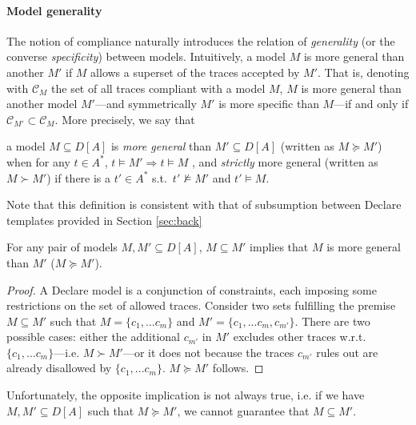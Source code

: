 \paragraph{Model generality} The notion of compliance naturally introduces the relation of \emph{generality} (or the converse \emph{specificity}) between models.
%
Intuitively, a model $M$ is more general than another $M'$ if $M$ allows a superset of the traces accepted by $M'$. That is, denoting with $\mathcal{C}_M$ the set of all traces compliant with a model $M$, $M$ is more general than another model $M'$---and symmetrically $M'$ is more specific than $M$---if and only if $\mathcal{C}_{M'} \subset \mathcal{C}_M$. 
%
More precisely, we say that 
\theoremstyle{definition}\label{def:generality}
\begin{definition}{}
a model $M\subseteq D[A]$ is \emph{more general} than $M'\subseteq D[A]$ (written as $M \succeq M'$) when for any $t\in A^*$, $t\models M' \Rightarrow t\models M$ , and \emph{strictly} more general (written as $M \succ M'$) if there is a $t'\in A^*$ s.t.\ $t'\not\models M'$ and $t'\models M$.
\end{definition}

Note that this definition is consistent with that of subsumption between Declare templates provided in Section \ref{sec:back}

\theoremstyle{definition}\label{th:subset-generality}
\begin{theorem}{}
For any pair of models $M, M'\subseteq D[A]$, $M\subseteq M'$ implies that $M$ is more general than $M'$ ($M\succeq M'$).
\end{theorem} 
\begin{proof}
A Declare model is a conjunction of constraints, each imposing some restrictions on the set of allowed traces. Consider two sets fulfilling the premise $M\subseteq M'$ such that $M=\{c_1,...c_m\}$ and $M'=\{c_1,...c_m, c_{m'}\}$. There are two possible cases: either the additional $c_{m'}$ in $M'$ excludes other traces w.r.t. $\{c_1,...c_m\}$---i.e. $M \succ M'$---or it does not because the traces $c_{m'}$ rules out are already disallowed by $\{c_1,...c_m\}$. $M\succeq M'$ follows.
\end{proof}

Unfortunately, the opposite implication is not always true, i.e. if we have $M, M'\subseteq D[A]$ such that $M\succeq M'$, we cannot guarantee that $M\subseteq M'$.

